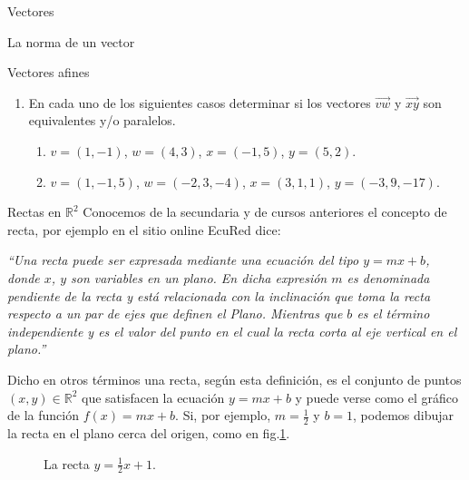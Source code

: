 \documentclass[a4paper,12pt,twoside,spanish,reqno]{amsbook}
\numberwithin{equation}{section}
\theoremstyle{definition}
\theoremstyle{remark}
\newcommand{\R}{\mathbb R}
\begin{document}
\begin{chapter}{Vectores}
\begin{section}{La norma de un vector}
\begin{section}{Vectores afines}
    \begin{enumerate}

        \item En  cada uno de los siguientes casos determinar si los
        vectores  $\overrightarrow{vw}$ y $\overrightarrow{xy}$ son
        equivalentes y/o paralelos.
        \begin{enumerate}
        \item   $v=(1,-1)$,  $w=(4,3)$, $x=(-1,5)$, $y=(5,2)$. 
        \item   $v=(1,-1,5)$,  $w=(-2,3,-4)$,  $x=(3,1,1)$,  $y=(-3,9,-17)$.
        \end{enumerate}
        
    \end{enumerate}
    \end{section}




    \end{section}

    \begin{section}{Rectas en $\R^2$}\label{seccion-rectas-en-r2}
    Conocemos de la secundaria y de cursos anteriores el concepto de recta, por ejemplo en el  sitio online EcuRed dice: 
    
    \textit{``Una recta puede ser expresada mediante una ecuación del tipo $y = m x + b$, donde $x$, $y$ son variables en un plano. En dicha expresión $m$ es denominada pendiente de la recta y está relacionada con la inclinación que toma la recta respecto a un par de ejes que definen el Plano. Mientras que $b$ es el término independiente y es el valor del punto en el cual la recta corta al eje vertical en el plano.''}
    
    Dicho en otros términos una recta,  según esta definición, es el conjunto de puntos $(x,y) \in \R^2$ que satisfacen la ecuación $y = m x + b$ y puede verse como el gráfico de la función $f(x) = m x + b$. Si, por ejemplo, $m=\frac12$ y $b=1$, podemos dibujar la recta en el plano cerca del origen, como en fig.\ref{fig-recta-funcion}.
    \begin{figure}[h]
        \caption{La recta $y = \frac12x +1$.}
        \label{fig-recta-funcion}
    \end{figure} 
    

\end{section}
\end{chapter}
\end{document}

